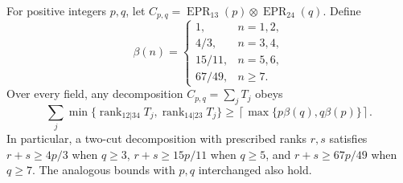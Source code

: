 \begin{corollary}
\label{pg:singh-rectangular}
For positive integers $p,q$, let
$C_{p,q}=\operatorname{EPR}_{13}(p)\otimes
\operatorname{EPR}_{24}(q)$. Define
\[
 \beta(n)=
 \begin{cases}
 1,&n=1,2,\\
 4/3,&n=3,4,\\
 15/11,&n=5,6,\\
 67/49,&n\geq7.
 \end{cases}
\]
Over every field, any decomposition $C_{p,q}=\sum_jT_j$ obeys
\[
 \sum_j\min\{\operatorname{rank}_{12|34}T_j,
              \operatorname{rank}_{14|23}T_j\}
 \geq
 \left\lceil\max\{p\beta(q),q\beta(p)\}\right\rceil.
 \tag{PG-SINGH-rectangular}
\]
In particular, a two-cut decomposition with prescribed ranks
$r,s$ satisfies $r+s\geq4p/3$ when $q\geq3$,
$r+s\geq15p/11$ when $q\geq5$, and
$r+s\geq67p/49$ when $q\geq7$.
The analogous bounds with $p,q$ interchanged also hold.
\end{corollary}
